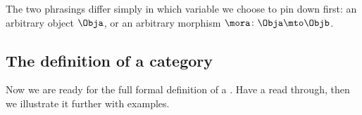 The two phrasings differ simply in which variable we choose to pin down first: an arbitrary object $\Obja$, or an arbitrary morphism $\mora \colon \Obja \mto \Objb$. 






\subsection{The definition of a category}

Now we are ready for the full formal definition of a .
Have a read through, then we illustrate it further with examples.


